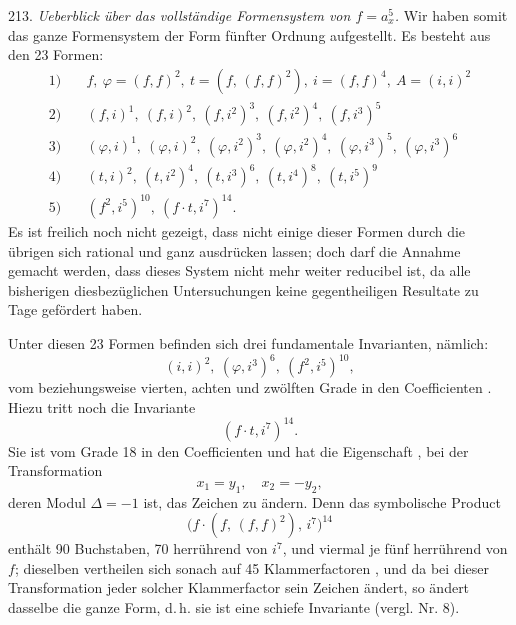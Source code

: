 213. \textit{Ueberblick \"uber das vollst\"andige Formensystem von $f = a_x^5$.}
Wir haben somit das ganze Formensystem der Form f\"unfter Ordnung
aufgestellt. Es besteht aus den 23 Formen:
\[
\begin{aligned}
1) &\quad f,\ \varphi = (f,f)^2,\ t = (f,\,(f,f)^2),\ i = (f,f)^4,\ A = (i,i)^2 \\
2) &\quad (f,i)^1,\ (f,i)^2,\ (f,i^2)^3,\ (f,i^2)^4,\ (f,i^3)^5 \\
3) &\quad (\varphi,i)^1,\ (\varphi,i)^2,\ (\varphi,i^2)^3,\ (\varphi,i^2)^4,\ (\varphi,i^3)^5,\ (\varphi,i^3)^6 \\
4) &\quad (t,i)^2,\ (t,i^2)^4,\ (t,i^3)^6,\ (t,i^4)^8,\ (t,i^5)^9 \\
5) &\quad (f^2,i^5)^{10},\ (f \cdot t, i^7)^{14}.
\end{aligned}
\]
Es ist freilich noch nicht gezeigt, dass nicht einige dieser Formen
durch die \"ubrigen sich rational und ganz ausdr\"ucken lassen; doch
darf die Annahme gemacht werden, dass dieses System nicht mehr
weiter reducibel ist, da alle bisherigen diesbez\"uglichen Untersuchungen
keine gegentheiligen Resultate zu Tage gef\"ordert haben.

Unter diesen 23 Formen befinden sich drei fundamentale Invarianten,
n\"amlich:
\[
(i,i)^2,\ (\varphi, i^3)^6,\ (f^2, i^5)^{10},
\]
vom beziehungsweise vierten, achten und zw\"olften Grade in den Coefficienten
. Hiezu tritt noch die Invariante
\[
(f \cdot t, i^7)^{14}.
\]
Sie ist vom Grade 18 in den Coefficienten und hat die Eigenschaft
, bei der Transformation
\[
x_1 = y_1,\quad x_2 = -y_2,
\]
deren Modul $\Delta = -1$ ist, das Zeichen zu \"andern. Denn das symbolische
 Product
\[
\bigl(f \cdot (f,\,(f,f)^2),\, i^7\bigr)^{14}
\]
enth\"alt 90 Buchstaben, 70 herr\"uhrend von $i^7$, und viermal je f\"unf
herr\"uhrend von $f$; dieselben vertheilen sich sonach auf 45 Klammerfactoren
, und da bei dieser Transformation jeder solcher Klammerfactor
sein Zeichen \"andert, so \"andert dasselbe die ganze Form, d.\,h. sie ist
eine \glqq schiefe Invariante\grqq{} (vergl. Nr. 8).


